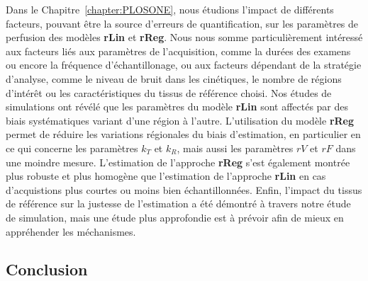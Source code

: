 \begin{otherlanguage}{francais}
Dans le Chapitre~\ref{chapter:PLOSONE}, nous \'etudions l'impact de diff\'erents facteurs, pouvant \^etre la source d'erreurs de quantification, sur les param\`etres de perfusion des mod\`eles \textbf{rLin} et \textbf{rReg}.
Nous nous somme particuli\`erement int\'eress\'e aux facteurs li\'es aux param\`etres de l'acquisition, comme la dur\'ees des examens ou encore la fr\'equence d'\'echantillonage, ou aux facteurs d\'ependant de la strat\'egie d'analyse, comme le niveau de bruit dans les cin\'etiques, le nombre de r\'egions d'int\'er\^et ou les caract\'eristiques du tissus de r\'ef\'erence choisi.
Nos \'etudes de simulations ont r\'ev\'el\'e que les param\`etres du mod\`ele \textbf{rLin} sont affect\'es par des biais syst\'ematiques variant d'une r\'egion \`a l'autre.
L'utilisation du mod\`ele \textbf{rReg} permet de r\'eduire les variations r\'egionales du biais d'estimation, en particulier en ce qui concerne les param\`etres $k_T$ et $k_R$, mais aussi les param\`etres $rV$ et $rF$
dans une moindre mesure.
L'estimation de l'approche \textbf{rReg} s'est \'egalement montr\'ee plus robuste et plus homog\`ene que l'estimation de l'approche \textbf{rLin} en cas d'acquistions plus courtes ou moins bien \'echantillonn\'ees.
Enfin, l'impact du tissus de r\'ef\'erence sur la justesse de l'estimation a \'et\'e d\'emontr\'e \`a travers notre \'etude de simulation, mais une \'etude plus approfondie est \`a pr\'evoir afin de mieux en appr\'ehender les m\'echanismes.

\subsection*{Conclusion}


\end{otherlanguage}